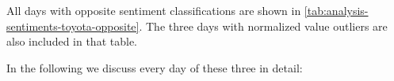 \begin{figure}[hbt]
    \centering
    
    \caption{\sentimentsCaption{\toyota}}
    \label{fig:analysis-sentiments-toyota}
\end{figure} 

All days with opposite sentiment classifications are shown in \cref{tab:analysis-sentiments-toyota-opposite}.
The three days with normalized value outliers are also included in that table.

In the following we discuss every day of these three in detail:


